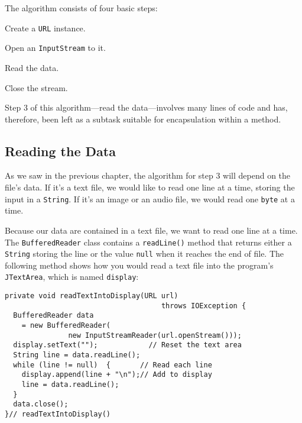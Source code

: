 \noindent  The algorithm consists of four basic steps:

\begin{BL}
\item  Create a {\tt URL} instance.
\item  Open an {\tt InputStream} to it.
\item  Read the data.
\item  Close the stream.
\end{BL}

\noindent Step 3 of this algorithm---read the data---involves many
lines of code and has, therefore, been left as a subtask suitable for
encapsulation within a method.


\subsection*{Reading the Data}
\noindent As we saw in the previous chapter, the algorithm for step 3 will
depend on the file's data.  If it's a text file, we would like to read
one line at a time, storing the input in a {\tt String}.  If it's an
image or an audio file, we would read one {\tt byte} at a time.

Because our data are contained in a text file, we want to read one
line at a time.  The {\tt BufferedReader} class contains a
{\tt readLine()} method that returns either a {\tt String} storing
the line or the value {\tt null} when it reaches the end of file.
The following method shows how you would read a text file into
the program's {\tt JTextArea}, which is named {\tt display}:

\begin{jjjlisting}
\begin{lstlisting}
private void readTextIntoDisplay(URL url) 
                                     throws IOException {
  BufferedReader data
    = new BufferedReader(
               new InputStreamReader(url.openStream()));
  display.setText("");            // Reset the text area
  String line = data.readLine();
  while (line != null)  {       // Read each line
    display.append(line + "\n");// Add to display
    line = data.readLine();
  }
  data.close();
}// readTextIntoDisplay()
\end{lstlisting}
\end{jjjlisting}

